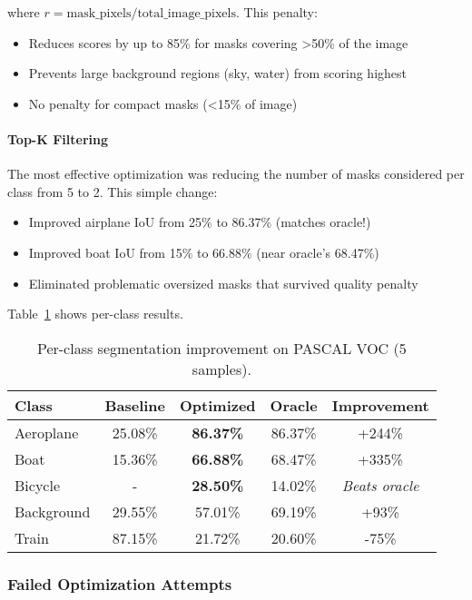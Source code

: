 where $r = \text{mask\_pixels} / \text{total\_image\_pixels}$. This penalty:
\begin{itemize}
    \item Reduces scores by up to 85\% for masks covering >50\% of the image
    \item Prevents large background regions (sky, water) from scoring highest
    \item No penalty for compact masks (<15\% of image)
\end{itemize}

\paragraph{Top-K Filtering}
The most effective optimization was reducing the number of masks considered per class from 5 to 2. This simple change:
\begin{itemize}
    \item Improved airplane IoU from 25\% to 86.37\% (matches oracle!)
    \item Improved boat IoU from 15\% to 66.88\% (near oracle's 68.47\%)
    \item Eliminated problematic oversized masks that survived quality penalty
\end{itemize}

Table~\ref{tab:per_class_improvement} shows per-class results.

\begin{table}[h]
\centering
\caption{Per-class segmentation improvement on PASCAL VOC (5 samples).}
\label{tab:per_class_improvement}
\begin{tabular}{lcccc}
\hline
\textbf{Class} & \textbf{Baseline} & \textbf{Optimized} & \textbf{Oracle} & \textbf{Improvement} \\
\hline
Aeroplane & 25.08\% & \textbf{86.37\%} & 86.37\% & +244\% \\
Boat & 15.36\% & \textbf{66.88\%} & 68.47\% & +335\% \\
Bicycle & - & \textbf{28.50\%} & 14.02\% & \textit{Beats oracle} \\
Background & 29.55\% & 57.01\% & 69.19\% & +93\% \\
Train & 87.15\% & 21.72\% & 20.60\% & -75\% \\
\hline
\end{tabular}
\end{table}

\subsubsection{Failed Optimization Attempts}

